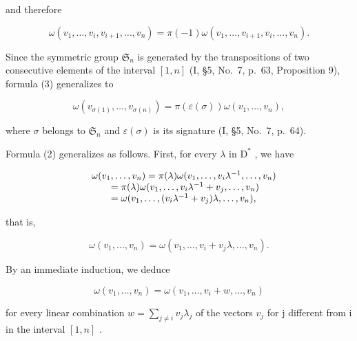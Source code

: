 and therefore

\[
\omega (v _ {1}, \dots , v _ {i}, v _ {i + 1}, \dots , v _ {n}) = \pi (- 1) \omega (v _ {1}, \dots , v _ {i + 1}, v _ {i}, \dots , v _ {n}).\tag{3}
\]

Since the symmetric group \(\mathfrak{S}_n\) is generated by the transpositions of two consecutive elements of the interval \([1,n]\) (I, §5, No.~7, p.~63, Proposition 9), formula (3) generalizes to

\[
\omega (v _ {\sigma (1)}, \ldots , v _ {\sigma (n)}) = \pi (\varepsilon (\sigma)) \omega (v _ {1}, \ldots , v _ {n}),\tag{4}
\]

where \(\sigma\) belongs to \(\mathfrak{S}_n\) and \(\varepsilon (\sigma)\) is its signature (I, §5, No.~7, p.~64).

Formula (2) generalizes as follows. First, for every \(\lambda\) in \(\mathrm{D}^*\) , we have

\[
\begin{array}{r l} & {\omega (v _ {1}, \ldots , v _ {n}) = \pi (\lambda) \omega (v _ {1}, \ldots , v _ {i} \lambda^ {- 1}, \ldots , v _ {n})} \\ & {\qquad = \pi (\lambda) \omega (v _ {1}, \ldots , v _ {i} \lambda^ {- 1} + v _ {j}, \ldots , v _ {n})} \\ & {\qquad = \omega (v _ {1}, \ldots , (v _ {i} \lambda^ {- 1} + v _ {j}) \lambda , \ldots , v _ {n}),} \end{array}
\]

that is,

\[
\omega (v _ {1}, \dots , v _ {n}) = \omega (v _ {1}, \dots , v _ {i} + v _ {j} \lambda , \dots , v _ {n}).\tag{5}
\]

By an immediate induction, we deduce

\[
\omega (v _ {1}, \ldots , v _ {n}) = \omega (v _ {1}, \ldots , v _ {i} + w, \ldots , v _ {n})\tag{6}
\]

for every linear combination \(w = \sum_{j \neq i} v_j \lambda_j\) of the vectors \(v_j\) for j different from i in the interval \([1, n]\) .

